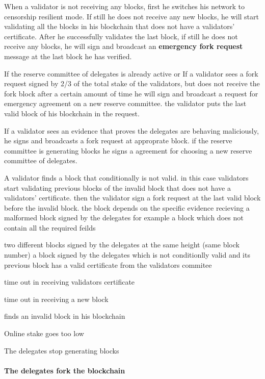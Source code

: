 When a validator is not receiving any blocks, first he switches his network to censorship resilient mode. If still he
does not receive any new blocks, he will start validating all the blocks in his blockchain that does not have
a validators' certificate. After he successfully validates the last block, if still he does not receive any blocks,
he will sign and broadcast an \textbf{emergency fork request} message at the last block he has
verified.

If the reserve committee of delegates is already active or If a validator sees a fork request signed
by 2/3 of the total stake of the validators, but does not receive the fork
block after a certain amount of time he will sign and broadcast a request for
emergency agreement on a new reserve committee. the validator puts the last valid block of his
blockchain in the request.

If a validator sees an evidence that proves the delegates are behaving maliciously, he signs and broadcasts a
fork request at approprate block. if the reserve committee is generating blocks he signs a agreement for choosing
a new reserve committee of delegates.

A validator finds a block that conditionally is not valid. in this case validators start validating previous blocks of the
invalid block that does not have a validators' certificate. then the validator sign a fork request at the last valid
block before the invalid block.
the block depends on the specific evidence
recieving a malformed block signed by the delegates for example a block which does not contain all the required feilds

two different blocks signed by the delegates at the same height (same block number)
a block signed by the delegates which is not conditionlly valid and its previous block has a valid certificate from the validators commitee



time out in receiving validators certificate

time out in receiving a new block

finds an invalid block in his blockchain

Online stake goes too low


The delegates stop generating blocks


\paragraph{The delegates fork the blockchain}
%
